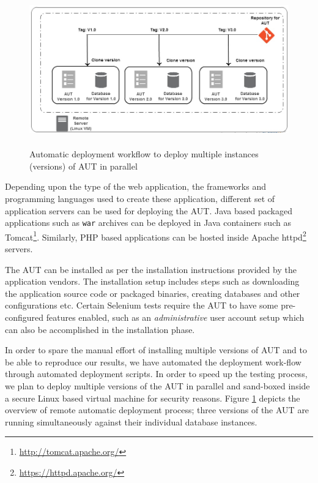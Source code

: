 \begin{figure}[h]
\makeatletter 
\makeatother
    \centering
  \includegraphics[width=5.4in,height=2.6in]{./Figures/Deployment_Process_2.jpg}
  \captionsetup{justification=raggedright,
singlelinecheck=false
}
  \caption{Automatic deployment workflow to deploy multiple instances (versions) of AUT in parallel}
  \label{fig:deployment} 
\end{figure}

Depending upon the type of the web application, the frameworks and programming languages used to create these application, different set of application servers can be used for deploying the AUT. Java based packaged applications such as \texttt{war} archives can be deployed in Java containers such as Tomcat\footnote{\url{http://tomcat.apache.org/}}. Similarly, PHP based applications can be hosted inside Apache httpd\footnote{\url{https://httpd.apache.org/}} servers. 

The AUT can be installed as per the installation instructions provided by the application vendors. The installation setup includes steps such as downloading the application source code or packaged binaries, creating databases and other configurations etc. Certain Selenium tests require the AUT to have some pre-configured features enabled, such as an \textit{administrative} user account setup which can also be accomplished in the installation phase. 

In order to spare the manual effort of installing multiple versions of AUT and to be able to reproduce our results, we have automated the deployment work-flow through automated deployment scripts. In order to speed up the testing process, we plan to deploy multiple versions of the AUT in parallel and sand-boxed inside a secure Linux based virtual machine for security reasons. Figure \ref{fig:deployment} depicts the overview of remote automatic deployment process; three versions of the AUT are running simultaneously against their individual database instances.

